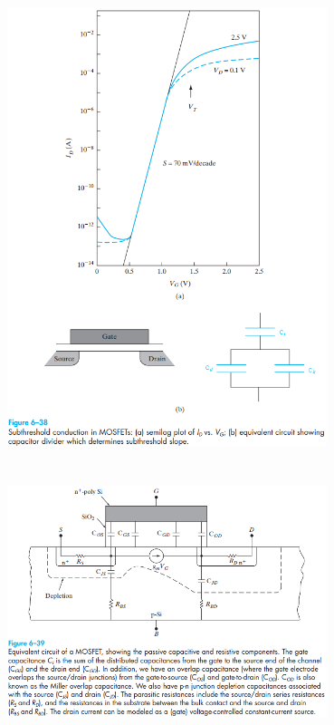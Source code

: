\documentclass[8pt]{article}
\newcommand{\hl}{\noindent\makebox[\linewidth]{\rule{\textwidth}{0.2pt}}}
\begin{document}
\begin{center}
		\includegraphics[width=0.7\textwidth]{fig6-38} \\ \hl \\~\\
		\includegraphics[width=0.7\textwidth]{fig6-39} \\ \hl \\~\\

\end{center}
\end{document}
